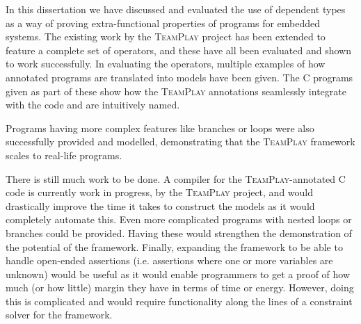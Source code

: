 
In this dissertation we have discussed and evaluated the use of dependent types as a way of proving extra-functional properties of programs for embedded systems. The existing work by the \textsc{TeamPlay} project has been extended to feature a complete set of operators, and these have all been evaluated and shown to work successfully. In evaluating the operators, multiple examples of how annotated programs are translated into \Idris models have been given. The C programs given as part of these show how the \textsc{TeamPlay} annotations seamlessly integrate with the code and are intuitively named.

Programs having more complex features like branches or loops were also successfully provided and modelled, demonstrating that the \textsc{TeamPlay} framework scales to real-life programs.

There is still much work to be done. A compiler for the \textsc{TeamPlay}-annotated C code is currently work in progress, by the \textsc{TeamPlay} project, and would drastically improve the time it takes to construct the \Idris models as it would completely automate this. Even more complicated programs with nested loops or branches could be provided. Having these would strengthen the demonstration of the potential of the framework. Finally, expanding the framework to be able to handle open-ended assertions (i.e. assertions where one or more variables are unknown) would be useful as it would enable programmers to get a proof of how much (or how little) margin they have in terms of time or energy. However, doing this is complicated and would require functionality along the lines of a constraint solver for the framework.
